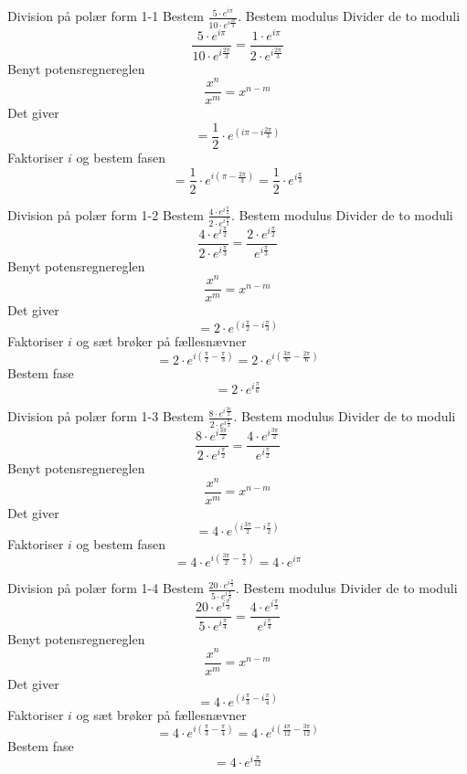 \documentclass{article}
\begin{document}
\tableofcontents
\newpage
\begin{exercise}{Division på polær form 1-1}
Bestem $ \frac{5 \cdot e^{i \pi}}{10 \cdot e^{i \frac{2 \pi}{3}}}$.
\hint
Bestem modulus
\hint
Divider de to moduli
\[\frac{5 \cdot e^{i \pi}}{10 \cdot e^{i \frac{2 \pi}{3}}} = \frac{1 \cdot e^{i \pi}}{2 \cdot e^{i \frac{2 \pi}{3}}}
\]
\hint
Benyt potensregnereglen
\[\frac{x^n}{x^m} = x^{n - m}
\]
\hint
Det giver
\[ = \frac{1}{2} \cdot e^{(i \pi - i\frac{2 \pi}{3}) }
\]
\hint
Faktoriser $i$ og bestem fasen
\[ = \frac{1}{2} \cdot e^{i( \pi - \frac{2 \pi}{3})} = \frac{1}{2} \cdot e^{i \frac{\pi}{3}}
\]
\end{exercise}
\newpage
\begin{exercise}{Division på polær form 1-2}
Bestem $ \frac{4 \cdot e^{i \frac{\pi}{2}}}{2 \cdot e^{i \frac{\pi}{3}}}$.
\hint
Bestem modulus
\hint
Divider de to moduli
\[\frac{4 \cdot e^{i \frac{\pi}{2}}}{2 \cdot e^{i \frac{\pi}{3}}} = \frac{2 \cdot e^{i \frac{\pi}{2}}}{e^{i \frac{\pi}{3}}}
\]
\hint
Benyt potensregnereglen
\[\frac{x^n}{x^m} = x^{n - m}
\]
\hint
Det giver
\[ = 2 \cdot e^{(i \frac{\pi}{2} - i \frac{\pi}{3})}
\]
\hint
Faktoriser $i$ og sæt brøker på fællesnævner
\[ = 2 \cdot e^{i( \frac{\pi}{2} - \frac{\pi}{3})} = 2 \cdot e^{i( \frac{3\pi}{6} - \frac{2\pi}{6})}
\]
\hint
Bestem fase
\[ = 2 \cdot e^{i \frac{\pi}{6}}
\]
\end{exercise}
\newpage
\begin{exercise}{Division på polær form 1-3}
Bestem $ \frac{8 \cdot e^{i \frac{3 \pi}{2}}}{2 \cdot e^{i \frac{\pi}{2}}}$.
\hint
Bestem modulus
\hint
Divider de to moduli
\[\frac{8 \cdot e^{i \frac{3 \pi}{2}}}{2 \cdot e^{i \frac{\pi}{2}}} = \frac{4 \cdot e^{i \frac{3 \pi}{2}}}{e^{i \frac{\pi}{2}}}
\]
\hint
Benyt potensregnereglen
\[\frac{x^n}{x^m} = x^{n - m}
\]
\hint
Det giver
\[ = 4 \cdot e^{(i \frac{3 \pi}{2} - i \frac{\pi}{2})}
\]
\hint
Faktoriser $i$ og bestem fasen
\[ = 4 \cdot e^{i( \frac{3 \pi}{2} - \frac{\pi}{2})} = 4 \cdot e^{i \pi}
\]
\end{exercise}
\newpage
\begin{exercise}{Division på polær form 1-4}
Bestem $ \frac{20\cdot e^{i \frac{\pi}{3}}}{5 \cdot e^{i \frac{\pi}{4}}}$.
\hint
Bestem modulus
\hint
Divider de to moduli
\[\frac{20\cdot e^{i \frac{\pi}{3}}}{5 \cdot e^{i \frac{\pi}{4}}} = \frac{4\cdot e^{i \frac{\pi}{3}}}{ e^{i \frac{\pi}{4}}}
\]
\hint
Benyt potensregnereglen
\[\frac{x^n}{x^m} = x^{n - m}
\]
\hint
Det giver
\[ = 4\cdot e^{(i \frac{\pi}{3} - i \frac{\pi}{4})}
\]
\hint
Faktoriser $i$ og sæt brøker på fællesnævner
\[ = 4\cdot e^{i( \frac{\pi}{3} - \frac{\pi}{4})} = 4\cdot e^{i( \frac{4\pi}{12} - \frac{3\pi}{12})}
\]
\hint
Bestem fase
\[ = 4 \cdot e^{i \frac{\pi}{12}}
\]
\end{exercise}
\end{document}
